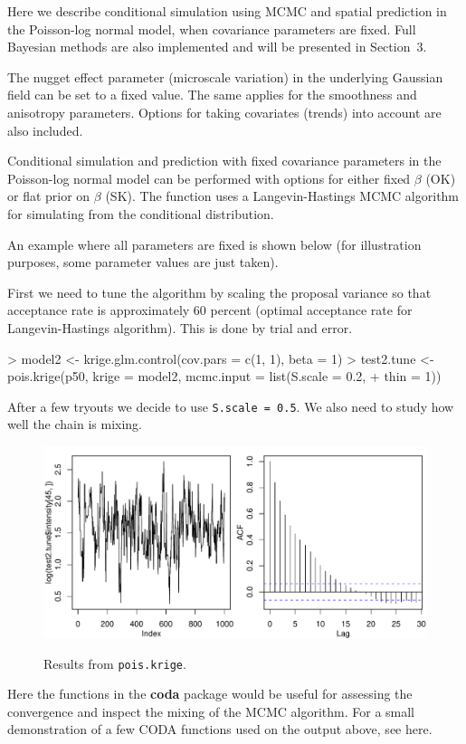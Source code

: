 \documentclass[12pt,a4paper]{article}
\newcommand{\strong}[1]{{\textbf{ #1}}}
\let\pkg=\strong
\newcommand{\code}[1]{\texttt{\small #1}}
\begin{document}
Here we describe conditional simulation using MCMC and spatial prediction in the Poisson-log normal model,  when covariance parameters are fixed.
Full Bayesian methods are also implemented and will be presented in Section~3. 

The nugget effect parameter (microscale variation) in the underlying Gaussian field can be set to a fixed value. 
The same applies for the smoothness and anisotropy parameters. Options for taking covariates (trends) into 
account are also included.

Conditional simulation and prediction with fixed covariance parameters in the Poisson-log normal model can be performed 
with options for either fixed $\beta$ (OK) or flat prior on $\beta$ (SK).
The function uses a Langevin-Hastings MCMC algorithm for simulating from the conditional distribution.

An example where all parameters are fixed is shown below (for illustration purposes, some parameter values are just taken).  

First we need to tune the algorithm by scaling the proposal variance so that acceptance rate is approximately 60 percent (optimal
acceptance rate for Langevin-Hastings algorithm). This is done by trial and error. 
\begin{Schunk}
\begin{Sinput}
> model2 <- krige.glm.control(cov.pars = c(1, 1), beta = 1)
> test2.tune <- pois.krige(p50, krige = model2, mcmc.input = list(S.scale = 0.2, 
+     thin = 1))
\end{Sinput}
\end{Schunk}
After a few tryouts we decide to use \code{S.scale = 0.5}.
We also need to study how well the chain is mixing.
\begin{figure}[h!]
\centering
\includegraphics{geoRglmintro-006}
\label{fig:pois.krige}
\caption{Results from \texttt{pois.krige}.}
\end{figure}    
Here the functions in the \pkg{coda} package would be useful for assessing the convergence and inspect the mixing of the MCMC 
algorithm. For a small demonstration of a few CODA functions used on 
the output above, see here.
\end{document}
